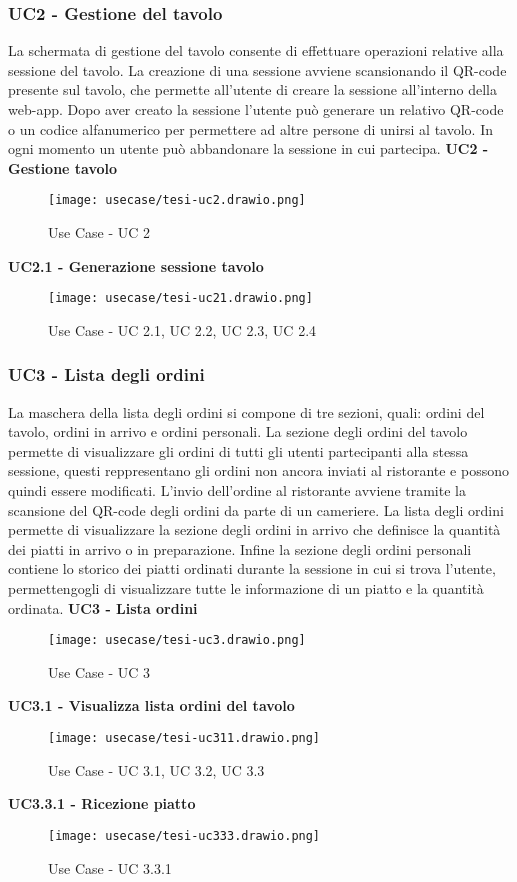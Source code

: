 \subsubsection{UC2 - Gestione del tavolo}
La schermata di gestione del tavolo consente di effettuare operazioni relative alla sessione del tavolo. La creazione di una sessione avviene scansionando il QR-code presente sul tavolo, che permette all'utente di creare la sessione all'interno della web-app. Dopo aver creato la sessione l'utente può generare un relativo QR-code o un codice alfanumerico per permettere ad altre persone di unirsi al tavolo. In ogni momento un utente può abbandonare la sessione in cui partecipa.
\textbf{UC2 - Gestione tavolo}
\begin{figure}[H]
    \centering
    \texttt{[image: usecase/tesi-uc2.drawio.png]}
    \caption{Use Case - UC 2}
\end{figure}
\textbf{UC2.1 - Generazione sessione tavolo}
\begin{figure}[H]
    \centering
    \texttt{[image: usecase/tesi-uc21.drawio.png]}
    \caption{Use Case - UC 2.1, UC 2.2, UC 2.3, UC 2.4}
\end{figure}
\subsubsection{UC3 - Lista degli ordini}
La maschera della lista degli ordini si compone di tre sezioni, quali: ordini del tavolo, ordini in arrivo e ordini personali.
La sezione degli ordini del tavolo permette di visualizzare gli ordini di tutti gli utenti partecipanti alla stessa sessione, questi reppresentano gli ordini non ancora inviati al ristorante e possono quindi essere modificati. L'invio dell'ordine al ristorante avviene tramite la scansione del QR-code degli ordini da parte di un cameriere. 
La lista degli ordini permette di visualizzare la sezione degli ordini in arrivo che definisce la quantità dei piatti in arrivo o in preparazione.
Infine la sezione degli ordini personali contiene lo storico dei piatti ordinati durante la sessione in cui si trova l'utente, permettengogli di visualizzare tutte le informazione di un piatto e la quantità ordinata.
\textbf{UC3 - Lista ordini}
\begin{figure}[H]
    \centering
    \texttt{[image: usecase/tesi-uc3.drawio.png]}
    \caption{Use Case - UC 3}
\end{figure}
\textbf{UC3.1 - Visualizza lista ordini del tavolo}
\begin{figure}[H]
    \centering
    \texttt{[image: usecase/tesi-uc311.drawio.png]}
    \caption{Use Case - UC 3.1, UC 3.2, UC 3.3}
\end{figure}
\textbf{UC3.3.1 - Ricezione piatto}
\begin{figure}[H]
    \centering
    \texttt{[image: usecase/tesi-uc333.drawio.png]}
    \caption{Use Case - UC 3.3.1}
\end{figure}
